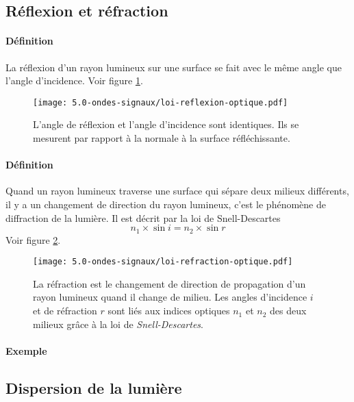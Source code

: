 \subsection{Réflexion et réfraction}
\paragraph{Définition} La réflexion d'un rayon lumineux sur une surface se fait avec le même angle que l'angle d'incidence. Voir figure \ref{fig:loi-reflexion-optique}.
\begin{figure}[h!]
  \begin{center}
      \texttt{[image: 5.0-ondes-signaux/loi-reflexion-optique.pdf]}
  \end{center}
  \caption{L'angle de réflexion et l'angle d'incidence sont identiques. Ils se mesurent par rapport à la normale à la surface réfléchissante.}
  \label{fig:loi-reflexion-optique}
\end{figure}

\paragraph{Définition} Quand un rayon lumineux traverse une surface qui sépare deux milieux différents, il y a un changement de direction du rayon lumineux, c'est le phénomène de diffraction de la lumière. Il est décrit par la loi de Snell-Descartes $$n_1 \times \sin{ i} = n_2 \times \sin{ r}$$ Voir figure \ref{fig:loi-refraction-optique}.
\begin{figure}[h!]
  \begin{center}
      \texttt{[image: 5.0-ondes-signaux/loi-refraction-optique.pdf]}
  \end{center}
  \caption{La réfraction est le changement de direction de propagation d'un rayon lumineux quand il change de milieu. Les angles d'incidence $i$ et de réfraction $r$ sont liés aux indices optiques $n_1$ et $n_2$ des deux milieux grâce à la loi de \textit{Snell-Descartes}.}
  \label{fig:loi-refraction-optique}
\end{figure}

\paragraph{Exemple}

\subsection{Dispersion de la lumière}
